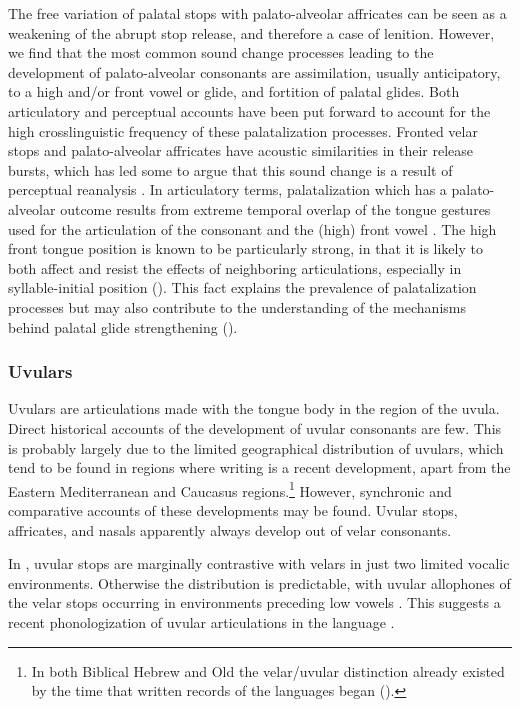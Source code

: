   The free variation of palatal stops with palato-alveolar affricates can be seen as a weakening of the abrupt stop release, and therefore a case of lenition. However, we find that the most common sound change processes leading to the development of palato-alveolar consonants are assimilation, usually anticipatory, to a high and/or front vowel or glide, and fortition of palatal glides. Both articulatory and perceptual accounts have been put forward to account for the high crosslinguistic frequency of these palatalization processes. Fronted velar stops and palato-alveolar affricates have acoustic similarities in their release bursts, which has led some to argue that this sound change is a result of perceptual reanalysis \citep{Guion1998}. In articulatory terms, palatalization which has a palato-alveolar outcome results from extreme temporal overlap of the tongue gestures used for the articulation of the consonant and the (high) front vowel \citep{Bateman2007}. The high front tongue position is known to be particularly strong, in that it is likely to both affect and resist the effects of neighboring articulations, especially in syllable-initial position (\citealt{RecasensEspinosa2009,Recasens2014}). This fact explains the prevalence of palatalization processes but may also contribute to the understanding of the mechanisms behind palatal glide strengthening (\citealt{BybeeEasterday2019}).

\subsubsection{{Uvulars}}\label{sec:4.5.2.2}

  Uvulars are articulations made with the tongue body in the region of the uvula. Direct historical accounts of the development of uvular consonants are few. This is probably largely due to the limited geographical distribution of uvulars, which tend to be found in regions where writing is a recent development, apart from the Eastern Mediterranean and Caucasus regions.\footnote{{In both Biblical Hebrew and Old  the velar/uvular distinction already existed by the time that written records of the languages began (\citealt{Rendsburg1997,Butskhrikidze2002}).}}  However, synchronic and comparative accounts of these developments may be found. Uvular stops, affricates, and nasals apparently always develop out of velar consonants.

  In , uvular stops are marginally contrastive with velars in just two limited vocalic environments. Otherwise the distribution is predictable, with uvular allophones of the velar stops occurring in environments preceding low vowels . This suggests a recent phonologization of uvular articulations in the language \citep[28]{Lidz2010}.

